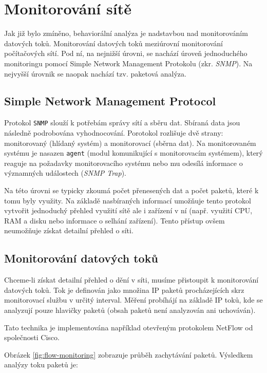 \section{Monitorování sítě}

Jak již bylo zmíněno, behaviorální analýza je nadstavbou nad monitorováním datových toků.
Monitorování datových toků meziúrovní monitorování počítačových sítí.
Pod ní, na nejnižší úrovni, se nachází úroveň jednoduchého monitoringu pomocí Simple Network Management Protokolu (zkr. \textit{SNMP}).
Na nejvyšší úrovnik se naopak nachází tzv. paketová analýza.

\subsection{Simple Network Management Protocol}

Protokol \texttt{SNMP} slouží k potřebám správy sítí a sběru dat.
Sbíraná data jsou následně podrobována vyhodnocování.
Porotokol rozlišuje dvě strany: monitorovaný (hlídaný systém) a monitorovací (sběrna dat).
Na monitorovaném systému je nasazen \texttt{agent} (modul komunikující s monitorovacím systémem), který reaguje na požadavky monitorovacího systému nebo mu odesílá informace o významných událostech (\textit{SNMP Trap}).

Na této úrovni se typicky zkoumá počet přenesených dat a počet paketů, které k tomu byly využity.
Na základě nasbíraných informací umožňuje tento protokol vytvořit jednoduchý přehled využití sítě ale i zařízení v ní (např. využití CPU, RAM a disku nebo informace o selhání zařízení).
Tento přístup ovšem neumožňuje získat detailní přehled o síti.

\subsection{Monitorování datových toků}

Chceme-li získat detailní přehled o dění v síti, musíme přistoupit k monitorování datových toků.
Tok je definován jako množina IP paketů procházejících skrz monitorovací službu v určitý interval.
Měření probíhájí na základě IP toků, kde se analyzují pouze hlavičky paketů (obsah paketů není analyzován ani uchováván).

Tato technika je implementována například otevřeným protokolem NetFlow od společnosti Cisco.


Obrázek \ref{fig:flow-monitoring} zobrazuje průběh zachytávání paketů.
Výsledkem analýzy toku paketů je:

